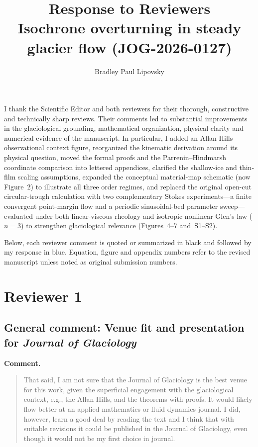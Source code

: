 \documentclass[11pt]{article}
\title{Response to Reviewers\\[4pt]\large Isochrone overturning in steady glacier flow (JOG-2026-0127)}
\author{Bradley Paul Lipovsky}
\date{}
\begin{document}
\maketitle

\noindent I thank the Scientific Editor and both reviewers for their thorough, constructive and technically sharp reviews. Their comments led to substantial improvements in the glaciological grounding, mathematical organization, physical clarity and numerical evidence of the manuscript. In particular, I added an Allan Hills observational context figure, reorganized the kinematic derivation around its physical question, moved the formal proofs and the Parrenin--Hindmarsh coordinate comparison into lettered appendices, clarified the shallow-ice and thin-film scaling assumptions, expanded the conceptual material-map schematic (now Figure~2) to illustrate all three order regimes, and replaced the original open-cut circular-trough calculation with two complementary Stokes experiments---a finite convergent point-margin flow and a periodic sinusoidal-bed parameter sweep---evaluated under both linear-viscous rheology and isotropic nonlinear Glen's law (\(n=3\)) to strengthen glaciological relevance (Figures~4--7 and~S1--S2).

Below, each reviewer comment is quoted or summarized in black and followed by my response in blue. Equation, figure and appendix numbers refer to the revised manuscript unless noted as original submission numbers.

\section*{Reviewer 1}

\subsection*{General comment: Venue fit and presentation for \emph{Journal of Glaciology}}

\noindent\textbf{Comment.}
\begin{quote}
That said, I am not sure that the Journal of Glaciology is the best venue for this work, given the superficial engagement with the glaciological context, e.g., the Allan Hills, and the theorems with proofs. It would likely flow better at an applied mathematics or fluid dynamics journal. I did, however, learn a good deal by reading the text and I think that with suitable revisions it could be published in the Journal of Glaciology, even though it would not be my first choice in journal.
\end{quote}
\end{document}
